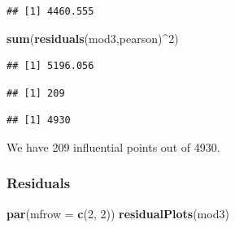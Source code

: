 \documentclass[
  twoside]{article}
\newenvironment{Shaded}{\begin{snugshade}}{\end{snugshade}}
\newcommand{\AttributeTok}[1]{\textcolor[rgb]{0.13,0.29,0.53}{#1}}
\newcommand{\ConstantTok}[1]{\textcolor[rgb]{0.56,0.35,0.01}{#1}}
\newcommand{\DecValTok}[1]{\textcolor[rgb]{0.00,0.00,0.81}{#1}}
\newcommand{\FunctionTok}[1]{\textcolor[rgb]{0.13,0.29,0.53}{\textbf{#1}}}
\newcommand{\NormalTok}[1]{#1}
\newcommand{\OtherTok}[1]{\textcolor[rgb]{0.56,0.35,0.01}{#1}}
\newcommand{\SpecialCharTok}[1]{\textcolor[rgb]{0.81,0.36,0.00}{\textbf{#1}}}
\newcommand{\StringTok}[1]{\textcolor[rgb]{0.31,0.60,0.02}{#1}}
\begin{document}
\begin{verbatim}
## [1] 4460.555
\end{verbatim}

\begin{Shaded}
\begin{Highlighting}[]
\FunctionTok{sum}\NormalTok{(}\FunctionTok{residuals}\NormalTok{(mod3,}\StringTok{\textquotesingle{}pearson\textquotesingle{}}\NormalTok{)}\SpecialCharTok{\^{}}\DecValTok{2}\NormalTok{)}
\end{Highlighting}
\end{Shaded}

\begin{verbatim}
## [1] 5196.056
\end{verbatim}

\begin{Shaded}
\end{Shaded}

\begin{verbatim}
## [1] 209
\end{verbatim}

\begin{Shaded}
\end{Shaded}

\begin{verbatim}
## [1] 4930
\end{verbatim}

We have 209 influential points out of 4930.

\hypertarget{residuals}{%
\subsubsection{Residuals}\label{residuals}}

\begin{Shaded}
\begin{Highlighting}[]
\FunctionTok{par}\NormalTok{(}\AttributeTok{mfrow =} \FunctionTok{c}\NormalTok{(}\DecValTok{2}\NormalTok{, }\DecValTok{2}\NormalTok{))}
\FunctionTok{residualPlots}\NormalTok{(mod3)}
\end{Highlighting}
\end{Shaded}
\end{document}
